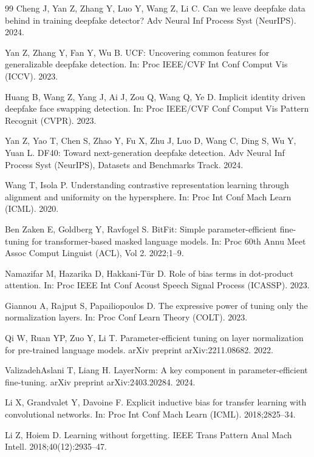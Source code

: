 \documentclass[fonts]{icst}
\begin{document}
\begin{thebibliography}{99}
Cheng J, Yan Z, Zhang Y, Luo Y, Wang Z, Li C.
Can we leave deepfake data behind in training deepfake detector?
Adv Neural Inf Process Syst (NeurIPS). 2024.

Yan Z, Zhang Y, Fan Y, Wu B.
UCF: Uncovering common features for generalizable deepfake detection.
In: Proc IEEE/CVF Int Conf Comput Vis (ICCV). 2023.

Huang B, Wang Z, Yang J, Ai J, Zou Q, Wang Q, Ye D.
Implicit identity driven deepfake face swapping detection.
In: Proc IEEE/CVF Conf Comput Vis Pattern Recognit (CVPR). 2023.

Yan Z, Yao T, Chen S, Zhao Y, Fu X, Zhu J, Luo D, Wang C, Ding S, Wu Y, Yuan L.
DF40: Toward next-generation deepfake detection.
Adv Neural Inf Process Syst (NeurIPS), Datasets and Benchmarks Track. 2024.

Wang T, Isola P.
Understanding contrastive representation learning through alignment and uniformity on the hypersphere.
In: Proc Int Conf Mach Learn (ICML). 2020.

Ben Zaken E, Goldberg Y, Ravfogel S.
BitFit: Simple parameter-efficient fine-tuning for transformer-based masked language models.
In: Proc 60th Annu Meet Assoc Comput Linguist (ACL), Vol 2. 2022;1--9.

Namazifar M, Hazarika D, Hakkani-T{\"u}r D.
Role of bias terms in dot-product attention.
In: Proc IEEE Int Conf Acoust Speech Signal Process (ICASSP). 2023.

Giannou A, Rajput S, Papailiopoulos D.
The expressive power of tuning only the normalization layers.
In: Proc Conf Learn Theory (COLT). 2023.

Qi W, Ruan YP, Zuo Y, Li T.
Parameter-efficient tuning on layer normalization for pre-trained language models.
arXiv preprint arXiv:2211.08682. 2022.

ValizadehAslani T, Liang H.
LayerNorm: A key component in parameter-efficient fine-tuning.
arXiv preprint arXiv:2403.20284. 2024.

Li X, Grandvalet Y, Davoine F.
Explicit inductive bias for transfer learning with convolutional networks.
In: Proc Int Conf Mach Learn (ICML). 2018;2825--34.

Li Z, Hoiem D.
Learning without forgetting.
IEEE Trans Pattern Anal Mach Intell. 2018;40(12):2935--47.


\end{thebibliography}
\end{document}
